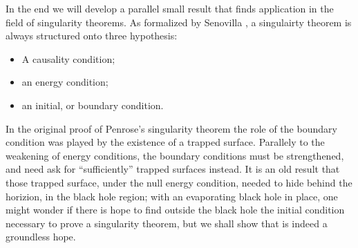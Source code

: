 In the end we will develop a parallel small result that finds application in the field of singularity theorems. As formalized by Senovilla \cite[]{senovilla1998singularity}, a singulairty theorem is always structured onto three hypothesis:
\begin{itemize}
    \item[\ding{99}] A causality condition; 
    \item[\ding{99}] an energy condition;
    \item[\ding{99}] an initial, or boundary condition.
\end{itemize}
In the original proof of Penrose's singularity theorem the role of the boundary condition was played by the existence of a trapped surface. Parallely to the weakening of energy conditions, the boundary conditions must be strengthened, and need ask for ``sufficiently'' trapped surfaces instead. It is an old result that those trapped surface, under the null energy condition, needed to hide behind the horizion, in the black hole region; with an evaporating black hole in place, one might wonder if there is hope to find outside the black hole the initial condition necessary to prove a singularity theorem, but we shall show that is indeed a groundless hope.